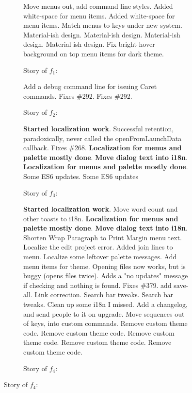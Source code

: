 \begin{figure}[!ht]
\begin{subfigure}[t]{\textwidth}
	\caption*{Story of $f_1$:}
	{\scriptsize 	Move menus out, add command line styles. Added white-space for menu items. Added white-space for menu items. Match menus to keys under new system. Material-ish design. Material-ish design. Material-ish design. Material-ish design. Fix bright hover background on top menu items for dark theme.}
\end{subfigure}
\begin{subfigure}[t]{\textwidth}
	\caption*{Story of $f_2$:}
	{\scriptsize Add a debug command line for issuing Caret commands. Fixes \#292. Fixes \#292.}
\end{subfigure}

	\begin{subfigure}[ht]{\textwidth}
		\caption*{Story of $f_3$:}
	{\scriptsize \textbf{Started localization work}.
	Successful retention, paradoxically, never called the openFromLaunchData callback. Fixes \#268.
	\textbf{Localization for menus and palette mostly done}. \textbf{Move dialog text into i18n}. \textbf{Localization for menus and palette mostly done}.
	Some ES6 updates. Some ES6 updates}
	\end{subfigure}
	
	\begin{subfigure}[!ht]{\textwidth}
		\caption*{Story of $f_4$:}
		{\scriptsize \textbf{Started localization work}.
		Move word count and other toasts to i18n. \textbf{Localization for menus and palette mostly done}. \textbf{Move dialog text into i18n}.
		Shorten Wrap Paragraph to Print Margin menu text.
		Localize the edit project error.
		Added join lines to menu.
		Localize some leftover palette messages.
		Add menu items for theme.
		Opening files now works, but is buggy (opens files twice).
		Adds a "no updates" message if checking and nothing is found.
		Fixes \#379.
		add save-all.
		Link correction.
		Search bar tweaks. Search bar tweaks. Clean up some i18n I missed.
		Add a changelog, and send people to it on upgrade. Move sequences out of keys, into custom commands.
		Remove custom theme code. Remove custom theme code. Remove custom theme code. Remove custom theme code. Remove custom theme code.}
	\end{subfigure}
\end{figure}



